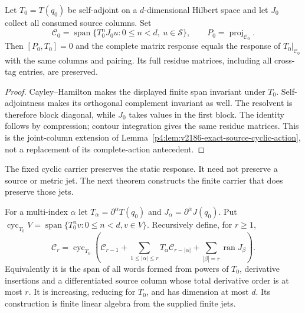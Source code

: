 \documentclass[12pt,a4paper]{article}
\begin{document}
\begin{theorem}
\label{p4:thm:v251-joint-cyclic-response}
Let $T_0=T(q_0)$ be self-adjoint on a $d$-dimensional Hilbert space and
let $J_0$ collect all consumed source columns. Set
\[
 \mathscr C_0=\operatorname{span}\{T_0^nJ_0u:0\le n<d,\ u\in\mathscr S\},
 \qquad P_0=\operatorname{proj}_{\mathscr C_0}.
\]
Then $[P_0,T_0]=0$ and the complete matrix response equals the response
of $T_0|_{\mathscr C_0}$ with the same columns and pairing. Its full
residue matrices, including all cross-tag entries, are preserved.
\end{theorem}
\begin{proof}
Cayley--Hamilton makes the displayed finite span invariant under $T_0$.
Self-adjointness makes its orthogonal complement invariant as well.
The resolvent is therefore block diagonal, while $J_0$ takes values in
the first block. The identity follows by compression; contour integration
gives the same residue matrices. This is the joint-column extension of
Lemma~\ref{p4:lem:v2186-exact-source-cyclic-action}, not a replacement of
its complete-action antecedent.
\end{proof}

The fixed cyclic carrier preserves the static response. It need not
preserve a source or metric jet. The next theorem constructs the finite
carrier that does preserve those jets.

For a multi-index $\alpha$ let $T_\alpha=\partial^\alpha T(q_0)$ and
$J_\alpha=\partial^\alpha J(q_0)$. Put
$\operatorname{cyc}_{T_0}V=\operatorname{span}\{T_0^nv:0\le n<d,v\in V\}$.
Recursively define, for $r\ge1$,
\[
 \mathscr C_r=\operatorname{cyc}_{T_0}\left(
 \mathscr C_{r-1}
 +\sum_{1\le|\alpha|\le r}T_\alpha\mathscr C_{r-|\alpha|}
 +\sum_{|\beta|=r}\operatorname{ran}J_\beta\right).
\]
Equivalently it is the span of all words formed from powers of $T_0$,
derivative insertions and a differentiated source column whose total
derivative order is at most $r$. It is increasing, reducing for $T_0$,
and has dimension at most $d$. Its construction is finite linear algebra
from the supplied finite jets.
\end{document}
